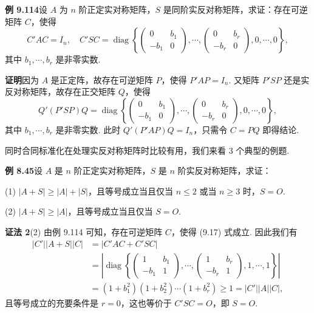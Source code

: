 \documentclass[UTF8,12pt,a4paper,fontset=fandol]{ctexart}
\begin{document}
\noindent\textbf{例 9.114}\quad 设 $A$ 为 $n$ 阶正定实对称矩阵，$S$ 是同阶实反对称矩阵，求证：存在可逆矩阵 $C$，使得
\begin{equation}
C'AC=I_n,\quad
C'SC=\operatorname{diag}\left\{
\begin{pmatrix}
0&b_1\\
-b_1&0
\end{pmatrix},\cdots,
\begin{pmatrix}
0&b_r\\
-b_r&0
\end{pmatrix},
0,\cdots,0
\right\},
\tag{9.17}
\end{equation}
其中 $b_1,\cdots,b_r$ 是非零实数.

\noindent\textbf{证明}\quad 因为 $A$ 是正定阵，故存在可逆矩阵 $P$，使得 $P'AP=I_n$. 又矩阵 $P'SP$ 还是实反对称矩阵，故存在正交矩阵 $Q$，使得
\[
Q'(P'SP)Q=\operatorname{diag}\left\{
\begin{pmatrix}
0&b_1\\
-b_1&0
\end{pmatrix},\cdots,
\begin{pmatrix}
0&b_r\\
-b_r&0
\end{pmatrix},
0,\cdots,0
\right\},
\]
其中 $b_1,\cdots,b_r$ 是非零实数. 此时 $Q'(P'AP)Q=I_n$，只需令 $C=PQ$ 即得结论.

同时合同标准化在处理实反对称矩阵时比较有用，我们来看 3 个典型的例题.

\noindent\textbf{例 8.45}\quad 设 $A$ 是 $n$ 阶正定实对称矩阵，$S$ 是 $n$ 阶实反对称矩阵，求证：

(1) $|A+S|\ge |A|+|S|$，且等号成立当且仅当 $n\le2$ 或当 $n\ge3$ 时，$S=O$.

(2) $|A+S|\ge |A|$，且等号成立当且仅当 $S=O$.

\noindent\textbf{证法 2}\quad (2) 由例 9.114 可知，存在可逆矩阵 $C$，使得 (9.17) 式成立. 因此我们有
\[
\begin{aligned}
|C'||A+S||C|
&=|C'AC+C'SC|\\
&=\left|\operatorname{diag}\left\{
\begin{pmatrix}
1&b_1\\
-b_1&1
\end{pmatrix},\cdots,
\begin{pmatrix}
1&b_r\\
-b_r&1
\end{pmatrix},
1,\cdots,1
\right\}\right|\\
&=(1+b_1^2)(1+b_2^2)\cdots(1+b_r^2)\ge1=|C'||A||C|,
\end{aligned}
\]
且等号成立的充要条件是 $r=0$，这也等价于 $C'SC=O$，即 $S=O$.
\end{document}
